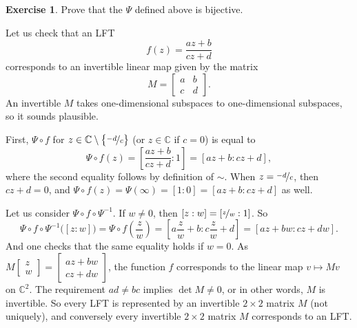 \documentclass[12pt,openany]{book}
\newcommand{\C}{{\mathbb{C}}}
\theoremstyle{plain}
\theoremstyle{remark}
\theoremstyle{definition}
\newenvironment{exbox}{%
    \def\FrameCommand{\vrule width 1pt \relax\hspace{10pt}}%
    \MakeFramed{\advance\hsize-\width\FrameRestore}%
}{%
    \endMakeFramed
}
\theoremstyle{exercise}
\newtheorem{exercise}{Exercise}[section]
\theoremstyle{example}
\begin{document}
\begin{exbox}
\begin{exercise}
Prove that the $\Psi$ defined above is bijective.
\end{exercise}
\end{exbox}

Let us check that an LFT
\begin{equation*}
f(z) = \frac{a z + b}{c z + d}
\end{equation*}
corresponds to an invertible linear map given by the matrix
\begin{equation*}
M =
\begin{bmatrix}
a & b \\
c & d
\end{bmatrix} .
\end{equation*}
An invertible $M$ takes one-dimensional subspaces to one-dimensional
subspaces, so it sounds plausible.

First, $\Psi \circ f$ for $z \in \C \setminus \bigl\{ \nicefrac{-d}{c} \bigr\}$
(or $z \in \C$ if $c=0$)
is equal to
\begin{equation*}
\Psi \circ f(z) =
\left[\frac{a z + b}{c z + d}: 1 \right]
=
\left[a z + b: c z + d \right] ,
\end{equation*}
where the second equality follows by definition of $\sim$.
When $z = \nicefrac{-d}{c}$, then $cz+d = 0$, and
$\Psi\circ f(z) = \Psi(\infty) = [1:0] = [az+b : cz+d]$ as well.

Let us consider $\Psi \circ f \circ \Psi^{-1}$.
If $w \neq 0$, then $[z:w] = [ \nicefrac{z}{w}:1 ]$.  So
\begin{equation*}
\Psi \circ f \circ \Psi^{-1} \bigl([z:w]\bigr) =
\Psi \circ f \left(\frac{z}{w}\right) =
\left[a \frac{z}{w} + b : c \frac{z}{w} + d \right] =
\left[a z + b w: c z + d w \right] .
\end{equation*}
And one checks that the same equality holds if $w=0$.
As
$M \left[ \begin{smallmatrix} z \\ w \end{smallmatrix} \right]
= \left[ \begin{smallmatrix} 
a z + b w \\ c z + d w
\end{smallmatrix} \right]$,
the function $f$ corresponds to the linear map $v \mapsto Mv$ on $\C^2$.
The requirement $ad \neq bc$ implies $\det M \neq 0$,
or in other words, $M$ is invertible.
So every LFT is represented by an invertible $2 \times 2$ matrix $M$
(not uniquely), and
conversely every invertible $2 \times 2$ matrix $M$ corresponds to an LFT\@.
\end{document}
